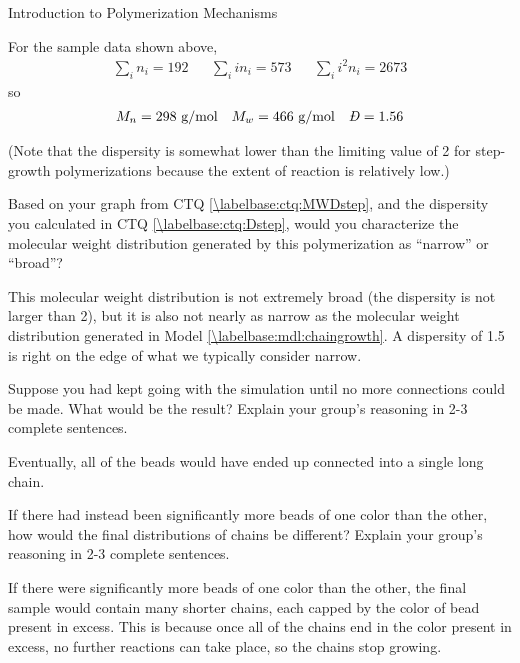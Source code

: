 \begin{activity}{Introduction to Polymerization Mechanisms}
\begin{ctqs}
\begin{solution}[3in]
{			For the sample data shown above,
			\begin{align*}
				\sum_i n_i = 192 && \sum_i i n_i = 573 && \sum_i i^2 n_i = 2673
			\end{align*}
			so
			\begin{align*}
				M_n = 298\text{ g/mol} && M_w = 466\text{ g/mol} && \PDImath = 1.56
			\end{align*}
			
			(Note that the dispersity is somewhat lower than the limiting value of 2 for step-growth polymerizations because the extent of reaction is relatively low.)
		}\end{solution}
	
	\question Based on your graph from CTQ \ref{\labelbase:ctq:MWDstep}, and the dispersity you calculated in CTQ \ref{\labelbase:ctq:Dstep}, would you characterize the molecular weight distribution generated by this polymerization as ``narrow'' or ``broad''?  %
	
		\begin{solution}[1in]
			This molecular weight distribution is not extremely broad (the dispersity is not larger than 2), but it is also not nearly as narrow as the molecular weight distribution generated in Model \ref{\labelbase:mdl:chaingrowth}.  A dispersity of 1.5 is right on the edge of what we typically consider narrow.
		\end{solution}
	
	\question Suppose you had kept going with the simulation until no more  connections could be made.  What would be the result?  Explain your group's reasoning in 2-3 complete sentences.
	
		\begin{solution}[1.75in]
			Eventually, all of the beads would have ended up connected into a single long chain.
		\end{solution}
	
	\question If there had instead been significantly more beads of one color than the other, how would the final distributions of chains be different?  Explain your group's reasoning in 2-3 complete sentences.
	
		\begin{solution}[1.75in]
			If there were significantly more beads of one color than the other, the final sample would contain many shorter chains, each capped by the color of bead present in excess.  This is because once all of the chains end in the color present in excess, no further reactions can take place, so the chains stop growing.
		\end{solution}
	

\end{ctqs}
\end{activity}
